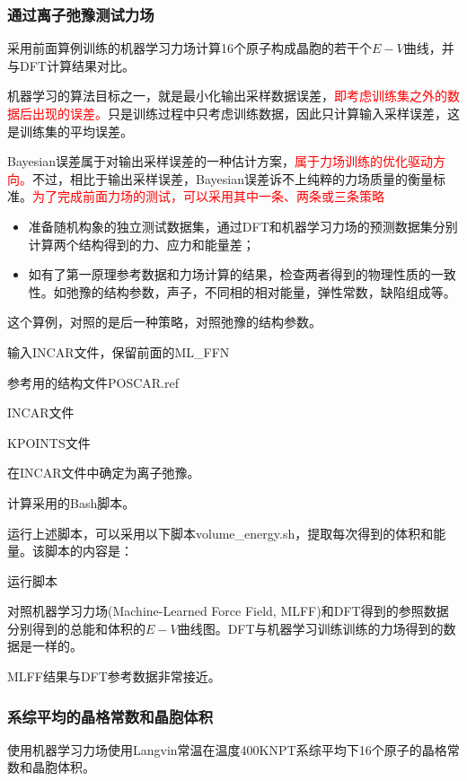 \subsubsection{通过离子弛豫测试力场}
采用前面算例训练的机器学习力场计算16个原子构成晶胞的若干个$E-V$曲线，并与\textrm{DFT}计算结果对比。

机器学习的算法目标之一，就是最小化输出采样数据误差，\textcolor{red}{即考虑训练集之外的数据后出现的误差。}只是训练过程中只考虑训练数据，因此只计算输入采样误差，这是训练集的平均误差。

\textrm{Bayesian}误差属于对输出采样误差的一种估计方案，\textcolor{red}{属于力场训练的优化驱动方向。}不过，相比于输出采样误差，\textrm{Bayesian}误差诉不上纯粹的力场质量的衡量标准。\textcolor{red}{为了完成前面力场的测试，可以采用其中一条、两条或三条策略}
\begin{itemize}
	\item 准备随机构象的独立测试数据集，通过\textrm{DFT}和机器学习力场的预测数据集分别计算两个结构得到的力、应力和能量差；
	\item 如有了第一原理参考数据和力场计算的结果，检查两者得到的物理性质的一致性。如弛豫的结构参数，声子，不同相的相对能量，弹性常数，缺陷组成等。
\end{itemize}
这个算例，对照的是后一种策略，对照弛豫的结构参数。

输入\textrm{INCAR}文件，保留前面的\textrm{ML\_FFN}

参考用的结构文件\textrm{POSCAR.ref}

\textrm{INCAR}文件

\textrm{KPOINTS}文件

在\textrm{INCAR}文件中确定为离子弛豫。

计算采用的\textrm{Bash}脚本。

运行上述脚本，可以采用以下脚本\textrm{volume\_energy.sh}，提取每次得到的体积和能量。该脚本的内容是：

运行脚本

对照机器学习力场\textrm{(Machine-Learned Force Field, MLFF)}和\textrm{DFT}得到的参照数据分别得到的总能和体积的$E-V$曲线图。\textrm{DFT}与机器学习训练训练的力场得到的数据是一样的。

\textrm{MLFF}结果与\textrm{DFT}参考数据非常接近。

\subsubsection{系综平均的晶格常数和晶胞体积}
使用机器学习力场使用\textrm{Langvin}常温在温度\textrm{400K}\textrm{NPT}系综平均下16个原子的晶格常数和晶胞体积。

